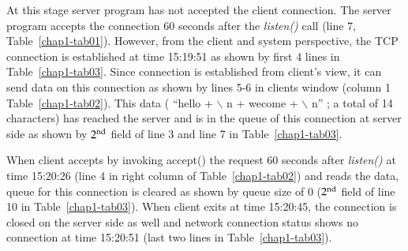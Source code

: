 \begin{multicols}{2}

At this stage server program has not accepted the client connection. The server program accepts the connection 60 seconds after the \textit{listen()} call (line 7, Table~\ref{chap1-tab01}). However, from the client and system perspective, the TCP connection is established at time 15:19:51 as shown by first 4 lines in Table~\ref{chap1-tab03}. Since connection is established from client’s view, it can send data on this connection as shown by lines 5-6 in clients window (column 1 Table~\ref{chap1-tab02}). This data ( “hello + $\backslash$ n + wecome + $\backslash$ n” ; a total of 14 characters)  has reached the server and is in the queue of this connection at server side as shown by $2^{\rm{nd}}$ field of line  3 and line 7 in Table~\ref{chap1-tab03}.


When client accepts by invoking accept() the request 60 seconds after \textit{listen()} at time 15:20:26 (line 4 in right column of Table~\ref{chap1-tab02}) and reads the data, queue for this connection is cleared as shown by queue size of 0 ($2^{\rm{nd}}$ field of line 10 in Table~\ref{chap1-tab03}). When client exits at time 15:20:45, the connection is closed on the server side as well and network connection status shows no connection at time 15:20:51 (last two lines in Table~\ref{chap1-tab03}). 


\end{multicols}
